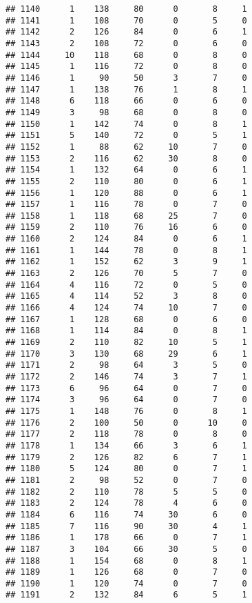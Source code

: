 \documentclass[
]{article}
\begin{document}
\begin{verbatim}
## 1140      1    138     80      0       8     1
## 1141      1    108     70      0       5     0
## 1142      2    126     84      0       6     1
## 1143      2    108     72      0       6     0
## 1144     10    118     68      0       8     0
## 1145      1    116     72      0       8     0
## 1146      1     90     50      3       7     0
## 1147      1    138     76      1       8     1
## 1148      6    118     66      0       6     0
## 1149      3     98     68      0       8     0
## 1150      1    142     74      0       8     1
## 1151      5    140     72      0       5     1
## 1152      1     88     62     10       7     0
## 1153      2    116     62     30       8     0
## 1154      1    132     64      0       6     1
## 1155      2    110     80      0       6     1
## 1156      1    120     88      0       6     1
## 1157      1    116     78      0       7     0
## 1158      1    118     68     25       7     0
## 1159      2    110     76     16       6     0
## 1160      2    124     84      0       6     1
## 1161      1    144     78      0       8     1
## 1162      1    152     62      3       9     1
## 1163      2    126     70      5       7     0
## 1164      4    116     72      0       5     0
## 1165      4    114     52      3       8     0
## 1166      4    124     74     10       7     0
## 1167      1    128     68      0       6     0
## 1168      1    114     84      0       8     1
## 1169      2    110     82     10       5     1
## 1170      3    130     68     29       6     1
## 1171      2     98     64      3       5     0
## 1172      2    146     74      3       7     1
## 1173      6     96     64      0       7     0
## 1174      3     96     64      0       7     0
## 1175      1    148     76      0       8     1
## 1176      2    100     50      0      10     0
## 1177      2    118     78      0       8     0
## 1178      1    134     66      3       6     1
## 1179      2    126     82      6       7     1
## 1180      5    124     80      0       7     1
## 1181      2     98     52      0       7     0
## 1182      2    110     78      5       5     0
## 1183      2    124     78      4       6     0
## 1184      6    116     74     30       6     0
## 1185      7    116     90     30       4     1
## 1186      1    178     66      0       7     1
## 1187      3    104     66     30       5     0
## 1188      1    154     68      0       8     1
## 1189      1    126     68      0       7     0
## 1190      1    120     74      0       7     0
## 1191      2    132     84      6       5     1

\end{verbatim}
\end{document}
